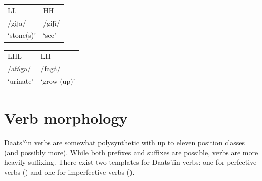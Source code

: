 \documentclass[output=paper]{langsci/langscibook}
\begin{document}
\ea\label{ex:ahlandc:4}

\begin{tabular}{ll}
LL &   HH  \\
/giʃa/  &    /gíʃí/ \\
‘stone(s)’    &  ‘see’ \\
 \end{tabular}
\z

\ea\label{ex:ahlandc:5}

\begin{tabular}{ll}
LHL   &     LH \\
  /afága/   &  /fagá/ \\
  ‘urinate’  &  ‘grow (up)’ \\
\end{tabular}
\z 

\section{Verb morphology}\label{sec:ahlandc:4}

Daats’íin verbs are somewhat polysynthetic with up to eleven position classes (and possibly more). While both prefixes and suffixes are possible, verbs are more heavily suffixing. There exist two templates for Daats’íin verbs: one for perfective verbs () and one for imperfective verbs ().
\end{document}
